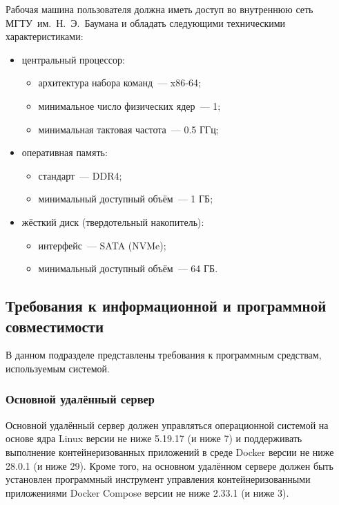\documentclass{bmstu}
\begin{document}
  Рабочая машина пользователя должна иметь доступ во внутреннюю сеть
  МГТУ~им.~Н.~Э.~Баумана и обладать следующими техническими
  характеристиками:
  \begin{itemize}[label=---]
    \item центральный процессор:
      \begin{itemize}[label=---]
        \item архитектура набора команд~--- x86-64;
        \item минимальное число физических ядер~--- 1;
        \item минимальная тактовая частота~--- 0.5 ГГц;
      \end{itemize}
    \item оперативная память:
      \begin{itemize}[label=---]
        \item стандарт~--- DDR4;
        \item минимальный доступный объём~--- 1 ГБ;
      \end{itemize}
    \item жёсткий диск (твердотельный накопитель):
      \begin{itemize}[label=---]
        \item интерфейс~--- SATA (NVMe);
        \item минимальный доступный объём~--- 64 ГБ.
      \end{itemize}
  \end{itemize}

  \subsection{Требования к информационной и программной совместимости}

  В данном подразделе представлены требования к программным средствам,
  используемым системой.

  \subsubsection{Основной удалённый сервер}

  Основной удалённый сервер должен управляться операционной системой на основе
  ядра Linux версии не ниже 5.19.17 (и ниже 7) и поддерживать
  выполнение контейнеризованных приложений в среде Docker версии не
  ниже 28.0.1 (и ниже 29).
  Кроме того, на основном удалённом сервере должен быть установлен программный
  инструмент управления контейнеризованными приложениями Docker
  Compose версии не ниже 2.33.1 (и ниже 3).
  
\end{document}

